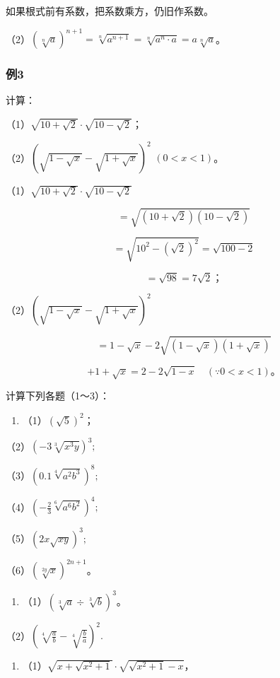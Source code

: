  如果根式前有系数，把系数乘方，仍旧作系数。

（2）\((\sqrt[n]{a})^{n+1} = \sqrt[n]{a^{n+1}} = \sqrt[n]{a^n \cdot a} = a\sqrt[n]{a}\)。

\subsubsection{例3}

计算：

（1）\(\sqrt{10 + \sqrt{2}} \cdot \sqrt{10 - \sqrt{2}}\)；

（2）\((\sqrt{1 - \sqrt{x}} - \sqrt{1 + \sqrt{x}})^2\) \((0 < x < 1)\)。

 （1）\(\sqrt{10 + \sqrt{2}}\cdot \sqrt{10 - \sqrt{2}}\)

\[
= \sqrt {(10 + \sqrt {2}) (10 - \sqrt {2})}
\]

\[
= \sqrt {10 ^ {2} - (\sqrt {2}) ^ {2}} = \sqrt {100 - 2}
\]

\[
= \sqrt {98} = 7 \sqrt {2}\text{；}
\]

（2）\((\sqrt{1 - \sqrt{x}} - \sqrt{1 + \sqrt{x}})^2\)

\[
= 1 - \sqrt {x} - 2 \sqrt {(1 - \sqrt {x}) (1 + \sqrt {x})}
\]

\[
+ 1 + \sqrt {x} = 2 - 2 \sqrt {1 - x} \quad (\because 0 <   x <   1)\text{。}
\]

计算下列各题（1～3）：

\begin{enumerate}
\item
  （1）\((\sqrt{5})^2\)；
\end{enumerate}

（2）\((-3\sqrt[3]{x^3y})^3;\)

（3）\((0.1\sqrt[4]{a^2b^3})^8;\)

（4）\(\left(-\frac{2}{3}\sqrt[6]{a^6b^2}\right)^4;\)

（5）\((2x\sqrt{xy})^3;\)

（6）\((\sqrt[2y]{x})^{2n + 1}\)。

\begin{enumerate}[start=2]
\item
  （1）\((\sqrt[3]{a} \div \sqrt[3]{b})^3\)。
\end{enumerate}

（2）\(\left(\sqrt[4]{\frac{a}{b}} - \sqrt[4]{\frac{b}{a}}\right)^2.\)

\begin{enumerate}[start=8]
\item
  （1）\(\sqrt{x + \sqrt{x^2 + 1}} \cdot \sqrt{\sqrt{x^2 + 1} - x}\)，
\end{enumerate}

